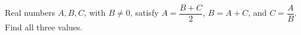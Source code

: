 Real numbers $ A,B,C $, with $ B\ne0 $, satisfy $ A=\dfrac{B+C}{2}$, $ B=A+C $, and $ C=\dfrac{A}{B}$. Find all three values.

